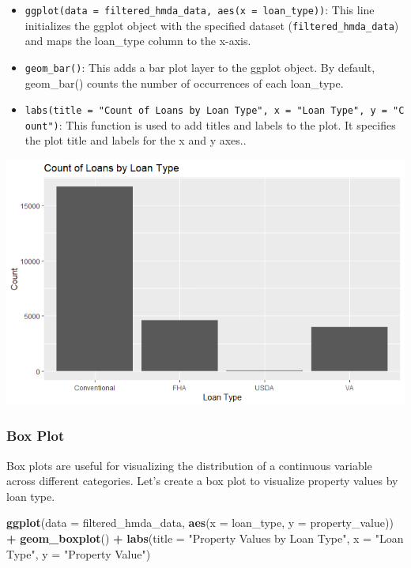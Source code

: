 \documentclass[
]{book}
\newenvironment{Shaded}{\begin{snugshade}}{\end{snugshade}}
\newcommand{\AttributeTok}[1]{\textcolor[rgb]{0.13,0.29,0.53}{#1}}
\newcommand{\FunctionTok}[1]{\textcolor[rgb]{0.13,0.29,0.53}{\textbf{#1}}}
\newcommand{\NormalTok}[1]{#1}
\newcommand{\SpecialCharTok}[1]{\textcolor[rgb]{0.81,0.36,0.00}{\textbf{#1}}}
\newcommand{\StringTok}[1]{\textcolor[rgb]{0.31,0.60,0.02}{#1}}
\providecommand{\tightlist}{%
  \setlength{\itemsep}{0pt}\setlength{\parskip}{0pt}}
\begin{document}
\begin{itemize}
\tightlist
\item
  \texttt{ggplot(data\ =\ filtered\_hmda\_data,\ aes(x\ =\ loan\_type))}: This line initializes the ggplot object with the specified dataset (\texttt{filtered\_hmda\_data}) and maps the loan\_type column to the x-axis.
\item
  \texttt{geom\_bar()}: This adds a bar plot layer to the ggplot object. By default, geom\_bar() counts the number of occurrences of each loan\_type.
\item
  \texttt{labs(title\ =\ "Count\ of\ Loans\ by\ Loan\ Type",\ x\ =\ "Loan\ Type",\ y\ =\ "Count")}: This function is used to add titles and labels to the plot. It specifies the plot title and labels for the x and y axes..
\end{itemize}

\includegraphics{images/bar_plot.PNG}

\hypertarget{box-plot}{%
\subsubsection*{Box Plot}\label{box-plot}}

Box plots are useful for visualizing the distribution of a continuous variable across different categories. Let's create a box plot to visualize property values by loan type.

\begin{Shaded}
\begin{Highlighting}[]
\FunctionTok{ggplot}\NormalTok{(}\AttributeTok{data =}\NormalTok{ filtered\_hmda\_data, }\FunctionTok{aes}\NormalTok{(}\AttributeTok{x =}\NormalTok{ loan\_type, }\AttributeTok{y =}\NormalTok{ property\_value)) }\SpecialCharTok{+}
  \FunctionTok{geom\_boxplot}\NormalTok{() }\SpecialCharTok{+}
  \FunctionTok{labs}\NormalTok{(}\AttributeTok{title =} \StringTok{"Property Values by Loan Type"}\NormalTok{,}
       \AttributeTok{x =} \StringTok{"Loan Type"}\NormalTok{,}
       \AttributeTok{y =} \StringTok{"Property Value"}\NormalTok{)}
\end{Highlighting}
\end{Shaded}
\end{document}

